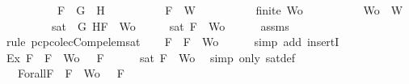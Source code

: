\begin{isabellebody}
\ \ \ \ \ \ \ \ \ \ {\isachardoublequoteopen}F\ {\isacharequal}\ \isactrlbold {\isasymnot}{\isacharparenleft}G\ \isactrlbold {\isasymor}\ H{\isacharparenright}{\isachardoublequoteclose}\isanewline
\ \ \ \ \ \ \ \ \ \ {\isachardoublequoteopen}F\ {\isasymin}\ W{\isachardoublequoteclose}\isanewline
\ \ \ \ \ \ \ \ \ \ {\isachardoublequoteopen}finite\ Wo{\isachardoublequoteclose}\isanewline
\ \ \ \ \ \ \ \ \ \ {\isachardoublequoteopen}Wo\ {\isasymsubseteq}\ W{\isachardoublequoteclose}\isanewline
\ \ \ \ \ \ \ \ \ {\isachardoublequoteopen}sat\ {\isacharparenleft}{\isacharbraceleft}\isactrlbold {\isasymnot}\ G{\isacharcomma}\isactrlbold {\isasymnot}\ H{\isacharcomma}F{\isacharbraceright}\ {\isasymunion}\ Wo{\isacharparenright}{\isachardoublequoteclose}\isanewline
%
\isadelimproof
%
\endisadelimproof
%
\isatagproof
{}\isamarkupfalse%
\ {\isacharminus}\isanewline
\ \ \isamarkupfalse%
\ {\isachardoublequoteopen}sat\ {\isacharparenleft}{\isacharbraceleft}F{\isacharbraceright}\ {\isasymunion}\ Wo{\isacharparenright}{\isachardoublequoteclose}\isanewline
\ \ \ \ \isamarkupfalse%
\ assms{\isacharparenleft}{}{\isacharcomma}{}{\isacharcomma}{}{\isacharcomma}{}{\isacharparenright}\ \isamarkupfalse%
\ {\isacharparenleft}rule\ pcp{\isacharunderscore}colecComp{\isacharunderscore}elem{\isacharunderscore}sat{\isacharparenright}\isanewline
\ \ \isamarkupfalse%
\ {\isachardoublequoteopen}F\ {\isasymin}\ {\isacharbraceleft}F{\isacharbraceright}\ {\isasymunion}\ Wo{\isachardoublequoteclose}\isanewline
\ \ \ \ \isamarkupfalse%
\ {\isacharparenleft}simp\ add{\isacharcolon}\ insertI{}{\isacharparenright}\isanewline
\ \ \isamarkupfalse%
\ Ex{}{\isacharcolon}{\isachardoublequoteopen}{\isasymexists}{\isasymA}{\isachardot}\ {\isasymforall}F\ {\isasymin}\ {\isacharparenleft}{\isacharbraceleft}F{\isacharbraceright}\ {\isasymunion}\ Wo{\isacharparenright}{\isachardot}\ {\isasymA}\ {\isasymTurnstile}\ F{\isachardoublequoteclose}\isanewline
\ \ \ \ \isamarkupfalse%
\ {\isacartoucheopen}sat\ {\isacharparenleft}{\isacharbraceleft}F{\isacharbraceright}\ {\isasymunion}\ Wo{\isacharparenright}{\isacartoucheclose}\ \isamarkupfalse%
\ {\isacharparenleft}simp\ only{\isacharcolon}\ sat{\isacharunderscore}def{\isacharparenright}\isanewline
\ \ \isamarkupfalse%
\ {\isasymA}\ \ Forall{}{\isacharcolon}{\isachardoublequoteopen}{\isasymforall}F\ {\isasymin}\ {\isacharparenleft}{\isacharbraceleft}F{\isacharbraceright}\ {\isasymunion}\ Wo{\isacharparenright}{\isachardot}\ {\isasymA}\ {\isasymTurnstile}\ F{\isachardoublequoteclose}\isanewline

\end{isabellebody}
